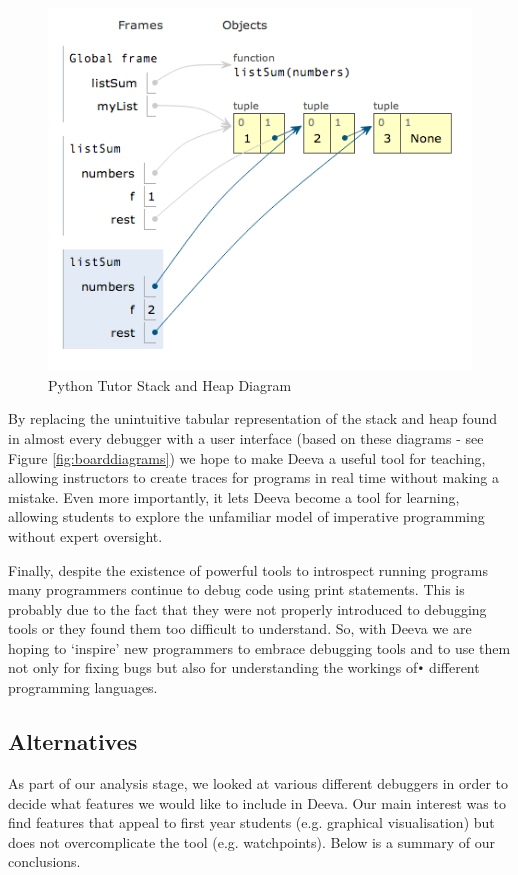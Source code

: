 \documentclass[11pt, a4paper]{article}
\begin{document}
\begin{figure}[h!]
\centering
\includegraphics[width=125mm]{PythonTutorStackHeap.png}
\caption{Python Tutor Stack and Heap Diagram}
\end{figure}

By replacing the unintuitive tabular representation of the stack and heap found in almost every debugger with a user interface (based on these diagrams - see Figure \ref{fig:boarddiagrams}) we hope to make Deeva a useful tool for teaching,
allowing instructors to create traces for programs in real time without making a mistake.
Even more importantly, it lets Deeva become a tool for learning, allowing students to explore the unfamiliar model of imperative programming without expert oversight.

Finally, despite the existence of powerful tools to introspect running programs many programmers continue to debug code using print statements.
This is probably due to the fact that they were not properly introduced to debugging tools or they found them too difficult to understand. So, with Deeva we are hoping to `inspire' new programmers to embrace debugging tools and to use them not only  for fixing bugs but also for understanding the workings of\texttt{•} different programming languages.

\subsection{Alternatives}
As part of our analysis stage, we looked at various different debuggers in order to decide what features we would like to include in Deeva. Our main interest was to find features that appeal to first year students (e.g. graphical visualisation) but does not overcomplicate the tool (e.g. watchpoints).
Below is a summary of our conclusions.
\end{document}
